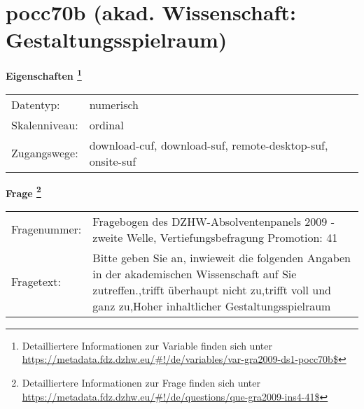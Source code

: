 
    \setcounter{footnote}{0}

    \vspace*{-1.8cm}
	\section{pocc70b (akad. Wissenschaft: Gestaltungsspielraum)}
	\label{section:pocc70b}



    \vspace*{0.5cm}
    \noindent\textbf{Eigenschaften
	\footnote{Detailliertere Informationen zur Variable finden sich unter
		\url{https://metadata.fdz.dzhw.eu/\#!/de/variables/var-gra2009-ds1-pocc70b$}}}\\
	\begin{tabularx}{\hsize}{@{}lX}
	Datentyp: & numerisch \\
	Skalenniveau: & ordinal \\
	Zugangswege: &
	  download-cuf, 
	  download-suf, 
	  remote-desktop-suf, 
	  onsite-suf
 \\
    \end{tabularx}



				\vspace*{0.5cm}
                \noindent\textbf{Frage
	                \footnote{Detailliertere Informationen zur Frage finden sich unter
		              \url{https://metadata.fdz.dzhw.eu/\#!/de/questions/que-gra2009-ins4-41$}}}\\
				\begin{tabularx}{\hsize}{@{}lX}
					Fragenummer: &
					  Fragebogen des DZHW-Absolventenpanels 2009 - zweite Welle, Vertiefungsbefragung Promotion:
					  41
 \\
					Fragetext: & Bitte geben Sie an, inwieweit die folgenden Angaben in der akademischen Wissenschaft auf Sie zutreffen.,trifft überhaupt nicht zu,trifft voll und ganz zu,Hoher inhaltlicher Gestaltungsspielraum \\
				\end{tabularx}





